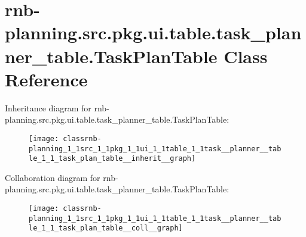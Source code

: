 \hypertarget{classrnb-planning_1_1src_1_1pkg_1_1ui_1_1table_1_1task__planner__table_1_1_task_plan_table}{}\section{rnb-\/planning.src.\+pkg.\+ui.\+table.\+task\+\_\+planner\+\_\+table.\+Task\+Plan\+Table Class Reference}
\label{classrnb-planning_1_1src_1_1pkg_1_1ui_1_1table_1_1task__planner__table_1_1_task_plan_table}


Inheritance diagram for rnb-\/planning.src.\+pkg.\+ui.\+table.\+task\+\_\+planner\+\_\+table.\+Task\+Plan\+Table\+:
\nopagebreak
\begin{figure}[H]
\begin{center}
\leavevmode
\texttt{[image: classrnb-planning\_1\_1src\_1\_1pkg\_1\_1ui\_1\_1table\_1\_1task\_\_planner\_\_table\_1\_1\_task\_plan\_table\_\_inherit\_\_graph]}
\end{center}
\end{figure}


Collaboration diagram for rnb-\/planning.src.\+pkg.\+ui.\+table.\+task\+\_\+planner\+\_\+table.\+Task\+Plan\+Table\+:
\nopagebreak
\begin{figure}[H]
\begin{center}
\leavevmode
\texttt{[image: classrnb-planning\_1\_1src\_1\_1pkg\_1\_1ui\_1\_1table\_1\_1task\_\_planner\_\_table\_1\_1\_task\_plan\_table\_\_coll\_\_graph]}
\end{center}
\end{figure}
